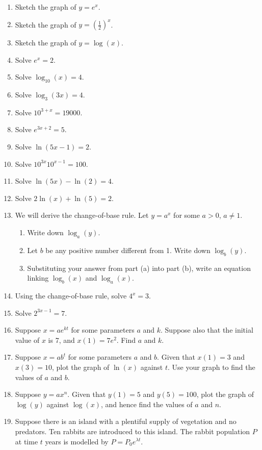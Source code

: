 \documentclass{article}
\begin{document}
\begin{enumerate}
	\item Sketch the graph of $y=e^x$.
	\item Sketch the graph of $y=\left(\frac{1}{2}\right)^x$.
	\item Sketch the graph of $y=\log(x)$.
	\item Solve $e^x=2$.
	\item Solve $\log_{10}(x)=4$.
	\item Solve $\log_{3}(3x)=4$.
	\item Solve $10^{3+x}=19000$.
	\item Solve $e^{3x+2}=5$.
	\item Solve $\ln(5x-1)=2$.
	\item Solve $10^{3x}10^{x-1}=100$.
	\item Solve $\ln(5x)-\ln(2)=4$.
	\item Solve $2\ln(x)+\ln(5)=2$.
	\item We will derive the change-of-base rule. Let $y=a^x$ for some $a>0$, $a\neq 1$.
		\begin{enumerate}
			\item Write down $\log_a(y)$.
			\item Let $b$ be any positive number different from 1. Write down $\log_b(y)$.
			\item Substituting your answer from part (a) into part (b), write an equation linking $\log_b(x)$ and $\log_a(x)$.
		\end{enumerate}
	\item Using the change-of-base rule, solve $4^x=3$.
	\item Solve $2^{3x-1}=7$.
	\item Suppose $x=ae^{kt}$ for some parameters $a$ and $k$. Suppose also that the initial value of $x$ is 7, and $x(1)=7e^2$. Find $a$ and $k$.
	\item Suppose $x=ab^{t}$ for some parameters $a$ and $b$. Given that $x(1)=3$ and $x(3)=10$, plot the graph of $\ln(x)$ against $t$. Use your graph to find the values of $a$ and $b$.
	\item Suppose $y=ax^n$. Given that $y(1)=5$ and $y(5)=100$, plot the graph of $\log(y)$ against $\log(x)$, and hence find the values of $a$ and $n$.
	\item Suppose there is an island with a plentiful supply of vegetation and no predators. Ten rabbits are introduced to this island. The rabbit population $P$ at time $t$ years is modelled by $P=P_0e^{\lambda t}$.
		\begin{enumerate}

\end{enumerate}
\end{enumerate}
\end{document}
